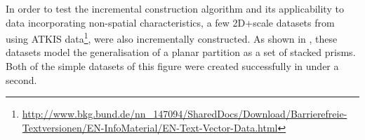In order to test the incremental construction algorithm and its applicability to data incorporating non-spatial characteristics, a few 2D+scale datasets from \citet{Meijers11} using ATKIS data\footnote{\url{http://www.bkg.bund.de/nn_147094/SharedDocs/Download/Barrierefreie-Textversionen/EN-InfoMaterial/EN-Text-Vector-Data.html}}, were also incrementally constructed.
As shown in , these datasets model the generalisation of a planar partition as a set of stacked prisms.
Both of the simple datasets of this figure were created successfully in under a second.

